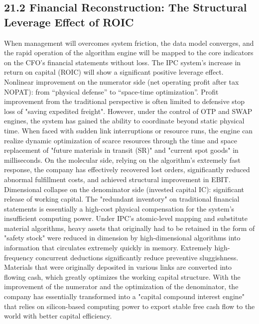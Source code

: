 \documentclass[11pt,a4paper]{article}
\begin{document}
\subsection*{21.2 Financial Reconstruction: The Structural Leverage Effect of ROIC}


When management will overcomes system friction, the data model converges, and the rapid operation of the algorithm engine will be mapped to the core indicators on the CFO's financial statements without loss. The IPC system's increase in return on capital (ROIC) will show a significant positive leverage effect. Nonlinear improvement on the numerator side (net operating profit after tax NOPAT): from “physical defense” to “space-time optimization”. Profit improvement from the traditional perspective is often limited to defensive stop loss of "saving expedited freight". However, under the control of OTP and SWAP engines, the system has gained the ability to coordinate beyond static physical time. When faced with sudden link interruptions or resource runs, the engine can realize dynamic optimization of scarce resources through the time and space replacement of "future materials in transit (SR)" and "current spot goods" in milliseconds. On the molecular side, relying on the algorithm's extremely fast response, the company has effectively recovered lost orders, significantly reduced abnormal fulfillment costs, and achieved structural improvement in EBIT. Dimensional collapse on the denominator side (invested capital IC): significant release of working capital. The "redundant inventory" on traditional financial statements is essentially a high-cost physical compensation for the system's insufficient computing power. Under IPC's atomic-level mapping and substitute material algorithms, heavy assets that originally had to be retained in the form of "safety stock" were reduced in dimension by high-dimensional algorithms into information that circulates extremely quickly in memory. Extremely high-frequency concurrent deductions significantly reduce preventive sluggishness. Materials that were originally deposited in various links are converted into flowing cash, which greatly optimizes the working capital structure. With the improvement of the numerator and the optimization of the denominator, the company has essentially transformed into a "capital compound interest engine" that relies on silicon-based computing power to export stable free cash flow to the world with better capital efficiency.
\end{document}
